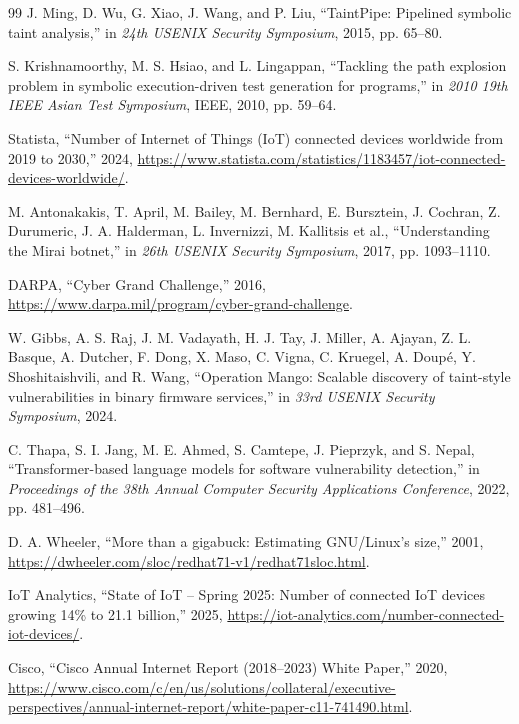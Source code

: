 \begin{thebibliography}{99}
J. Ming, D. Wu, G. Xiao, J. Wang, and P. Liu, ``TaintPipe: Pipelined symbolic taint analysis,'' in \textit{24th USENIX Security Symposium}, 2015, pp. 65--80.

S. Krishnamoorthy, M. S. Hsiao, and L. Lingappan, ``Tackling the path explosion problem in symbolic execution-driven test generation for programs,'' in \textit{2010 19th IEEE Asian Test Symposium}, IEEE, 2010, pp. 59--64.

Statista, ``Number of Internet of Things (IoT) connected devices worldwide from 2019 to 2030,'' 2024, \url{https://www.statista.com/statistics/1183457/iot-connected-devices-worldwide/}.

M. Antonakakis, T. April, M. Bailey, M. Bernhard, E. Bursztein, J. Cochran, Z. Durumeric, J. A. Halderman, L. Invernizzi, M. Kallitsis et al., ``Understanding the Mirai botnet,'' in \textit{26th USENIX Security Symposium}, 2017, pp. 1093--1110.

DARPA, ``Cyber Grand Challenge,'' 2016, \url{https://www.darpa.mil/program/cyber-grand-challenge}.

W. Gibbs, A. S. Raj, J. M. Vadayath, H. J. Tay, J. Miller, A. Ajayan, Z. L. Basque, A. Dutcher, F. Dong, X. Maso, C. Vigna, C. Kruegel, A. Doup\'{e}, Y. Shoshitaishvili, and R. Wang, ``Operation Mango: Scalable discovery of taint-style vulnerabilities in binary firmware services,'' in \textit{33rd USENIX Security Symposium}, 2024.

C. Thapa, S. I. Jang, M. E. Ahmed, S. Camtepe, J. Pieprzyk, and S. Nepal, ``Transformer-based language models for software vulnerability detection,'' in \textit{Proceedings of the 38th Annual Computer Security Applications Conference}, 2022, pp. 481--496.

D. A. Wheeler, ``More than a gigabuck: Estimating GNU/Linux's size,'' 2001, \url{https://dwheeler.com/sloc/redhat71-v1/redhat71sloc.html}.

IoT Analytics, ``State of IoT -- Spring 2025: Number of connected IoT devices growing 14\% to 21.1 billion,'' 2025, \url{https://iot-analytics.com/number-connected-iot-devices/}.

Cisco, ``Cisco Annual Internet Report (2018--2023) White Paper,'' 2020, \url{https://www.cisco.com/c/en/us/solutions/collateral/executive-perspectives/annual-internet-report/white-paper-c11-741490.html}.


\end{thebibliography}
